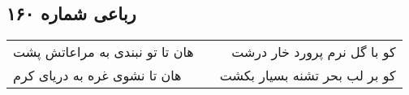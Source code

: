 \begin{center}
\section*{رباعی شماره ۱۶۰}
\label{sec:sh160}
\begin{longtable}{l p{0.5cm} r}
هان تا تو نبندی به مراعاتش پشت
&&
کو با گل نرم پرورد خار درشت
\\
هان تا نشوی غره به دریای کرم
&&
کو بر لب بحر تشنه بسیار بکشت
\\
\end{longtable}
\end{center}
